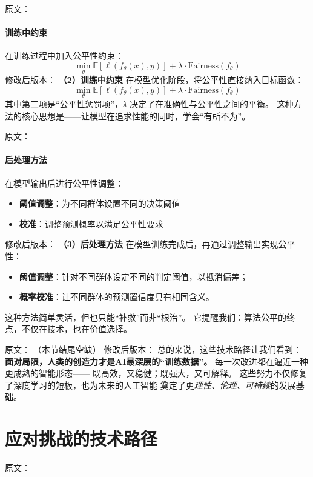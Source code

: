 原文：
\paragraph{训练中约束}
在训练过程中加入公平性约束：
$$\min_\theta \mathbb{E}[\ell(f_\theta(x), y)] + \lambda \cdot \text{Fairness}(f_\theta)$$
修改后版本：
\textbf{（2）训练中约束}  
在模型优化阶段，将公平性直接纳入目标函数：  
$$\min_\theta \mathbb{E}[\ell(f_\theta(x), y)] + \lambda \cdot \text{Fairness}(f_\theta)$$  
其中第二项是“公平性惩罚项”，\textit{λ} 决定了在准确性与公平性之间的平衡。  
这种方法的核心思想是——让模型在追求性能的同时，学会“有所不为”。



原文：
\paragraph{后处理方法}
在模型输出后进行公平性调整：
\begin{itemize}
\item \textbf{阈值调整}：为不同群体设置不同的决策阈值
\item \textbf{校准}：调整预测概率以满足公平性要求
\end{itemize}
修改后版本：
\textbf{（3）后处理方法}  
在模型训练完成后，再通过调整输出实现公平性：  
\begin{itemize}
\item \textbf{阈值调整}：针对不同群体设定不同的判定阈值，以抵消偏差；  
\item \textbf{概率校准}：让不同群体的预测置信度具有相同含义。  
\end{itemize}
这种方法简单灵活，但也只能“补救”而非“根治”。  
它提醒我们：算法公平的终点，不仅在技术，也在价值选择。



原文：
（本节结尾空缺）
修改后版本：
总的来说，这些技术路径让我们看到：  
\textbf{面对局限，人类的创造力才是AI最深层的“训练数据”。}  
每一次改进都在逼近一种更成熟的智能形态——  
既高效，又稳健；既强大，又可解释。  
这些努力不仅修复了深度学习的短板，也为未来的人工智能  
奠定了更\textit{理性、伦理、可持续}的发展基础。

\section{应对挑战的技术路径}

原文：
